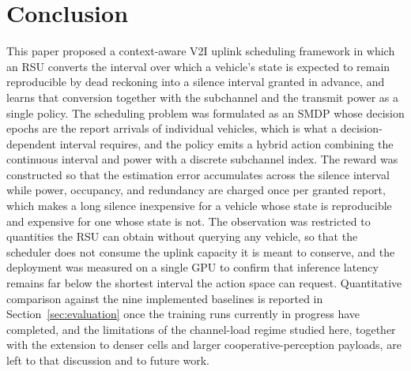 \documentclass[journal]{IEEEtran}
\begin{document}
\section{Conclusion}
\label{sec:conclusion}

This paper proposed a context-aware V2I uplink scheduling framework in which an RSU converts the interval over which a vehicle's state is expected to remain reproducible by dead reckoning into a silence interval granted in advance, and learns that conversion together with the subchannel and the transmit power as a single policy. The scheduling problem was formulated as an SMDP whose decision epochs are the report arrivals of individual vehicles, which is what a decision-dependent interval requires, and the policy emits a hybrid action combining the continuous interval and power with a discrete subchannel index. The reward was constructed so that the estimation error accumulates across the silence interval while power, occupancy, and redundancy are charged once per granted report, which makes a long silence inexpensive for a vehicle whose state is reproducible and expensive for one whose state is not. The observation was restricted to quantities the RSU can obtain without querying any vehicle, so that the scheduler does not consume the uplink capacity it is meant to conserve, and the deployment was measured on a single GPU to confirm that inference latency remains far below the shortest interval the action space can request. Quantitative comparison against the nine implemented baselines is reported in Section~\ref{sec:evaluation} once the training runs currently in progress have completed, and the limitations of the channel-load regime studied here, together with the extension to denser cells and larger cooperative-perception payloads, are left to that discussion and to future work.


% 
\end{document}
